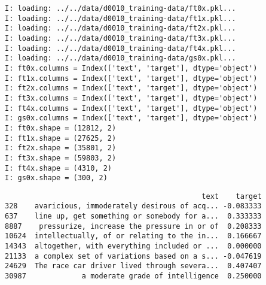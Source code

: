 \documentclass[a4paper,10pt,onecolumn,oneside,openright]{article}
\begin{document}
\begin{verbatim}
I: loading: ../../data/d0010_training-data/ft0x.pkl...
I: loading: ../../data/d0010_training-data/ft1x.pkl...
I: loading: ../../data/d0010_training-data/ft2x.pkl...
I: loading: ../../data/d0010_training-data/ft3x.pkl...
I: loading: ../../data/d0010_training-data/ft4x.pkl...
I: loading: ../../data/d0010_training-data/gs0x.pkl...
I: ft0x.columns = Index(['text', 'target'], dtype='object')
I: ft1x.columns = Index(['text', 'target'], dtype='object')
I: ft2x.columns = Index(['text', 'target'], dtype='object')
I: ft3x.columns = Index(['text', 'target'], dtype='object')
I: ft4x.columns = Index(['text', 'target'], dtype='object')
I: gs0x.columns = Index(['text', 'target'], dtype='object')
I: ft0x.shape = (12812, 2)
I: ft1x.shape = (27625, 2)
I: ft2x.shape = (35801, 2)
I: ft3x.shape = (59803, 2)
I: ft4x.shape = (4310, 2)
I: gs0x.shape = (300, 2)
\end{verbatim}
\begin{verbatim}
                                              text    target
328    avaricious, immoderately desirous of acq... -0.083333
637    line up, get something or somebody for a...  0.333333
8887    pressurize, increase the pressure in or of  0.208333
10624  intellectually, of or relating to the in...  0.166667
14343  altogether, with everything included or ...  0.000000
21133  a complex set of variations based on a s... -0.047619
24629  The race car driver lived through severa...  0.407407
30987             a moderate grade of intelligence  0.250000
\end{verbatim}
\end{document}
